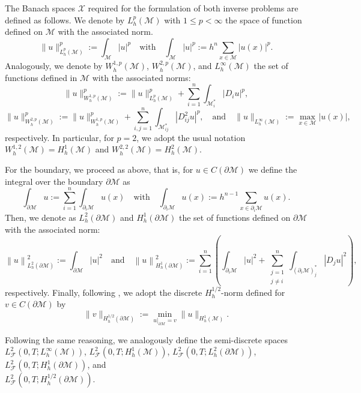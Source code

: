 \documentclass[11pt,oneside,leqno]{amsart}
\numberwithin{equation}{section}
\numberwithin{equation}{section}
\begin{document}
The Banach spaces $\mathcal{X}$ required for the formulation of both inverse problems are defined as follows. We denote by $L^p_{h}(\mathcal{M})$ with $1\leq p<\infty$ the space of function defined on $\mathcal{M}$ with the associated norm.
\[
\|u\|_{L_{h}^p(\mathcal{M})}^p:= \int_{\mathcal{M}}|u|^p\quad \text{with}\quad
\int_{\mathcal{M}}|u|^p:= h^n \sum_{x\in \mathcal{M}}|u(x)|^p.
\]
Analogously, we denote by $W^{1,p}_h(\mathcal{M})$, $W_h^{2,p}(\mathcal{M})$, and $L^{\infty}_{h}(\mathcal{M})$ the set of functions defined in $\mathcal{M}$ with the associated norms:
\begin{equation*}
    \|u\|_{W_h^{1,p}(\mathcal{M})}^p := \|u\|_{L_h^p(\mathcal{M})}^p+{ \sum_{i=1}^{n}}\int_{\mathcal{M}_i^{\ast}}|D_iu|^p,
\end{equation*}
\begin{equation*}
    \|u\|_{W_h^{2,p}(\mathcal{M})}^p :=  \|u\|_{W_h^{1,p}(\mathcal{M})}^p+{ \sum_{i,j=1}^{n}}\int_{{ \mathcal{M}_{ij}^{\ast}}}|D_{ij}^2u|^p,\quad\text{and}\quad \|u\|_{L_h^{\infty}(\mathcal{M})}:=\max_{x\in \mathcal{M}}|u(x)|,
\end{equation*}
respectively. In particular, for $p=2$, we adopt the usual notation $W^{1,2}_h(\mathcal{M})=H_h^{1}(\mathcal{M})$ and $W_h^{2,2}(\mathcal{M})=H_h^{2}(\mathcal{M})$.  

For the boundary, we proceed as above, that is, for $u\in C(\partial \mathcal{M})$ we define the integral over the boundary $\partial\mathcal{M}$ as
\[
\int_{\partial \mathcal{M}}u:= \sum_{i=1}^{n}\int_{\partial_i\mathcal{M}}u(x)\quad \text{with}\quad
\int_{\partial_i\mathcal{M}}u(x):= h^{n-1}\sum_{x\in\partial_i\mathcal{M}} u(x).
\]
Then, we denote as $L^{2}_{h}(\partial\mathcal{M})$ and $H^{1}_{h}(\partial\mathcal{M})$ the set of functions defined on $\partial\mathcal{M}$ with the associated norm: \[
\left\|u \right\|^{2}_{L^{2}_{h}(\partial\mathcal{M})}:=\int_{\partial\mathcal{M}}|u|^2\quad \text{and}\quad\left\| u\right\|^{2}_{H^{1}_{h}(\partial\mathcal{M})}:={ \sum_{i=1}^n}\left(\int_{\partial_i \mathcal{M}}|u|^2+\sum_{\substack{j=1 \\ j \neq i}}^{n}\int_{(\partial_i\mathcal{M})_{j}^{\ast}}|D_ju|^2\right),
\]
respectively. Finally, following \cite{EDG:2011}, we adopt the discrete $H^{1/2}_{h}$-norm defined for $v \in C(\partial\mathcal{M})$ by
\[
\|v\|_{H_{h}^{1/2}(\partial \mathcal{M})}:= \min_{\left.u\right|_{\partial\mathcal{M}}=v}\|u\|_{H^1_{h}(\mathcal{M})}.
\]

Following the same reasoning, we analogously define the semi-discrete spaces \\
$L^2_{\mathcal{F}}(0,T;L_h^\infty(\mathcal{M}))$, $L^2_{\mathcal{F}}(0,T;H_h^1(\mathcal{M}))$, $L^2_{\mathcal{F}}(0,T;L_h^2(\partial\mathcal{M}))$, $L^2_{\mathcal{F}}(0,T;H_h^1(\partial\mathcal{M}))$, and \\
$L^2_{\mathcal{F}}(0,T;H_h^{1/2}(\partial\mathcal{M}))$.
\end{document}
